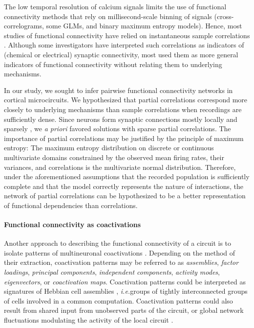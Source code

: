 \documentclass[10pt]{article}
\newcommand{\Kcomment}[1]{{\color{blue}{[KJ: #1]}}}
\newcommand{\ie}{\emph{i.e.}\;}
\begin{document}
The low temporal resolution of calcium signals limits the use of functional connectivity methods that rely on millisecond-scale binning of signals (cross-correlograms, some GLMs, and binary maximum entropy models).  Hence, most studies of functional connectivity have relied on instantaneous sample correlations \cite{Greenberg:2008, Golshani:2009, Hofer:2011, Malmersjo:2013} .  Although some investigators have interpreted such correlations as indicators of (chemical or electrical) synaptic connectivity, most used them as more general indicators of functional connectivity without relating them to underlying mechanisms. 

In our study, we sought to infer pairwise functional connectivity networks  in cortical microcircuits. We hypothesized that partial correlations correspond more closely to underlying mechanisms than sample correlations when recordings are sufficiently dense.  Since neurons form synaptic connections mostly locally and sparsely \cite{Perin:2011}, we \emph{a priori} favored solutions with sparse partial correlations.  The importance of partial correlations may be justified by the principle of maximum entropy: The maximum entropy distribution on discrete or continuous multivariate domains constrained by the observed mean firing rates, their variances, and correlations is the multivariate normal distribution.  Therefore, under the aforementioned assumptions that the recorded population is sufficiently complete and that the model correctly represents the nature of interactions, the network of partial correlations can be hypothesized to be a better representation of functional dependencies than correlations. %

\paragraph{Functional connectivity as coactivations}
Another approach to describing the functional connectivity of a circuit is to isolate patterns of multineuronal coactivations \cite{Gerstein:1989, Chapin:1999, Peyrache:2010, Ch:2010, Lopes:2011, Lopes:2013}. Depending on the method of their extraction, coactivation patterns may be referred to as \emph{assemblies}, \emph{factor loadings}, \emph{principal components}, \emph{independent components}, \emph{activity modes}, \emph{eigenvectors}, or \emph{coactivation maps}. Coactivation patterns could be interpreted as signatures of Hebbian cell assemblies \cite{Gerstein:1989, Ch:2010}, \ie groups of tightly interconnected groups of cells involved in a common computation.  Coactivation patterns could also result from shared input from unobserved parts of the circuit, or global network fluctuations modulating the activity of the local circuit \cite{Okun:2012}.
\end{document}
